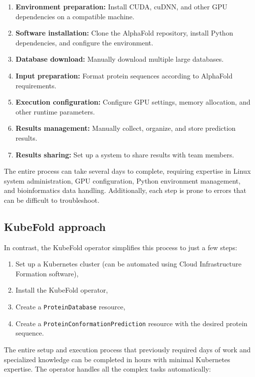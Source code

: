 \begin{enumerate}
    \item \textbf{Environment preparation:} Install CUDA, cuDNN, and other GPU dependencies on a compatible machine.
    \item \textbf{Software installation:} Clone the AlphaFold repository, install Python dependencies, and configure the environment.
    \item \textbf{Database download:} Manually download multiple large databases.
    \item \textbf{Input preparation:} Format protein sequences according to AlphaFold requirements.
    \item \textbf{Execution configuration:} Configure GPU settings, memory allocation, and other runtime parameters.
    \item \textbf{Results management:} Manually collect, organize, and store prediction results.
    \item \textbf{Results sharing:} Set up a system to share results with team members.
\end{enumerate}

The entire process can take several days to complete, requiring expertise in Linux system administration, GPU configuration, Python environment management, and bioinformatics data handling.
Additionally, each step is prone to errors that can be difficult to troubleshoot.

\subsection{KubeFold approach}

In contrast, the KubeFold operator simplifies this process to just a few steps:

\begin{enumerate}
    \item Set up a Kubernetes cluster (can be automated using Cloud Infrastructure Formation software),
    \item Install the KubeFold operator,
    \item Create a \texttt{ProteinDatabase} resource,
    \item Create a \texttt{ProteinConformationPrediction} resource with the desired protein sequence.
\end{enumerate}

The entire setup and execution process that previously required days of work and specialized knowledge can be completed in hours with minimal Kubernetes expertise.
The operator handles all the complex tasks automatically:

